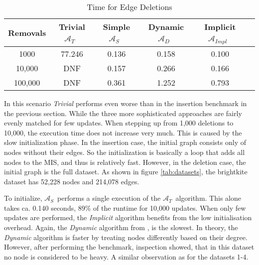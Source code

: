 \documentclass[letterpaper,11pt]{article}
\newcommand{\trivial}{$\mathcal{A}_T$\ }
\newcommand{\simple}{$\mathcal{A}_S$\ }
\newcommand{\dynamic}{$\mathcal{A}_{D}$\ }
\newcommand{\implicit}{$\mathcal{A}_{Impl}$\ }
\begin{document}
\begin{table}[h]
  \caption{Time for Edge Deletions}
  \label{tab:deletion}
  \centering
  \setlength{\extrarowheight}{0.3em}
	\begin{tabular}{|c|c|c|c|c|c|}
		\hline
		Removals & Trivial \trivial & Simple \simple & Dynamic \dynamic & Implicit \implicit \\
		\hline
		\hline
		1000 & 77.246 & 0.136 & 0.158 & 0.100 \\ %
		\hline
		10,000 & DNF & 0.157 & 0.266 & 0.166 \\
		\hline
		100,000 & DNF & 0.361 & 1.252 & 0.793 \\
		\hline
	\end{tabular}
\end{table}

In this scenario \textit{Trivial} performs even worse than in the insertion
benchmark in the previous section. While the three more sophisticated approaches are fairly evenly matched
for few updates. When stepping up from 1,000 deletions to 10,000, the execution
time does not increase very much. This is caused by the slow initialization
phase. In the insertion case, the initial graph consists only of nodes without
their edges. So the initialization is basically a loop that adds all nodes to
the MIS, and thus is relatively fast. However, in the deletion case, the initial
graph is the full dataset. As shown in figure \ref{tab:datasets}, the brightkite
dataset has 52,228 nodes and 214,078 edges.

To initialize, \simple performs a single execution of the
\trivial algorithm. This alone takes ca. 0.140 seconds, 89\% of the
runtime for 10,000 updates. When only few updates are performed, the
\textit{Implicit} algorithm benefits from the low initialisation overhead.
Again, the \textit{Dynamic} algorithm from \cite{gupta2018simple}, is the
slowest. In theory, the \textit{Dynamic} algorithm is faster by treating nodes
differently based on their degree. However, after performing the benchmark,
inspection showed, that in this dataset no node is considered to be heavy.
A similar observation as for the datasets 1-4.




\end{document}
